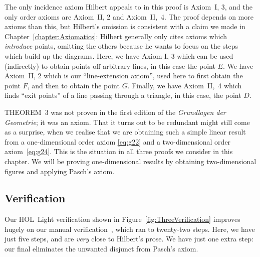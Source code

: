 The only incidence axiom Hilbert appeals to in this proof is Axiom~I, 3, and the only order axioms are Axiom~II, 2 and Axiom~II,~4. The proof depends on more axioms than this, but Hilbert's omission is consistent with a claim we made in Chapter~\ref{chapter:Axiomatics}: Hilbert generally only cites axioms which \emph{introduce} points, omitting the others because he wants to focus on the steps which build up the diagrams. Here, we have Axiom I, 3 which can be used (indirectly) to obtain points off arbitrary lines, in this case the point $E$. We have Axiom~II, 2 which is our ``line-extension axiom'', used here to first obtain the point $F$, and then to obtain the point $G$. Finally, we have Axiom~II,~4 which finds ``exit points'' of a line passing through a triangle, in this case, the point $D$.

THEOREM~3 was not proven in the first edition of the \emph{Grundlagen der Geometrie}; it was an axiom. That it turns out to be redundant might still come as a surprise, when we realise that we are obtaining such a simple linear result from a one-dimensional order axiom \eqref{eq:g22} and a two-dimensional order axiom~\eqref{eq:g24}. This is the situation in all three proofs we consider in this chapter. We will be proving one-dimensional results by obtaining two-dimensional figures and applying Pasch's axiom.

\subsection{Verification}
Our HOL~Light verification shown in Figure~\ref{fig:ThreeVerification} improves hugely on our manual verification~\cite{ScottMScThesis}, which ran to twenty-two steps. Here, we have just five steps, and are \emph{very} close to Hilbert's prose. We have just one extra step: our final  eliminates the unwanted disjunct from Pasch's axiom.

